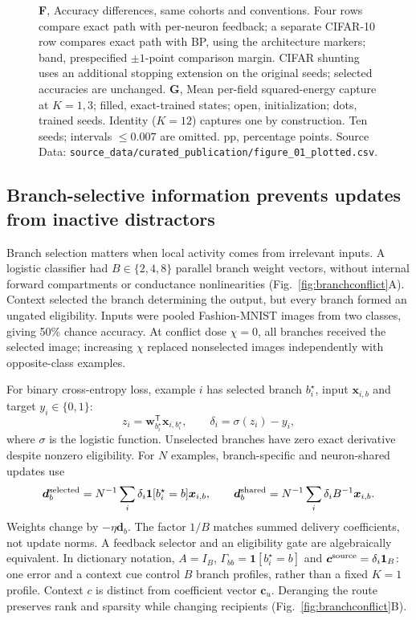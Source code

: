 \documentclass[11pt]{article}
\begin{document}
\begin{figure}[tbp]
{\textbf{F}, Accuracy differences, same cohorts and conventions. Four rows compare exact path with per-neuron feedback; a separate CIFAR-10 row compares exact path with BP, using the architecture markers; band, prespecified $\pm1$-point comparison margin. CIFAR shunting uses an additional stopping extension on the original seeds; selected accuracies are unchanged.
\textbf{G}, Mean per-field squared-energy capture at $K=1,3$; filled, exact-trained states; open, initialization; dots, trained seeds. Identity ($K=12$) captures one by construction. Ten seeds; intervals $\leq0.007$ are omitted. pp, percentage points. Source Data: \texttt{source\_data/curated\_publication/figure\_01\_plotted.csv}.}
\label{fig:framework}
\end{figure}

\subsection*{Branch-selective information prevents updates from inactive distractors}

Branch selection matters when local activity comes from irrelevant inputs. A logistic classifier had $B\in\{2,4,8\}$ parallel branch weight vectors, without internal forward compartments or conductance nonlinearities (Fig.~\ref{fig:branchconflict}A). Context selected the branch determining the output, but every branch formed an ungated eligibility. Inputs were pooled Fashion-MNIST images from two classes, giving 50\% chance accuracy. At conflict dose $\chi=0$, all branches received the selected image; increasing $\chi$ replaced nonselected images independently with opposite-class examples.

For binary cross-entropy loss, example $i$ has selected branch $b_i^\star$, input $\bm x_{i,b}$ and target $y_i\in\{0,1\}$:
\begin{equation}
z_i=\bm w_{b_i^\star}^{\mathsf T}\bm x_{i,b_i^\star},\qquad
\delta_i=\sigma(z_i)-y_i,
\label{eq:branchconflictforward}
\end{equation}
where $\sigma$ is the logistic function. Unselected branches have zero exact derivative despite nonzero eligibility. For $N$ examples, branch-specific and neuron-shared updates use
\begin{equation}
\bm d_b^{\rm selected}=N^{-1}\sum_i\delta_i\mathbf1[b_i^\star=b]\bm x_{i,b},\qquad
\bm d_b^{\rm shared}=N^{-1}\sum_i\delta_i B^{-1}\bm x_{i,b}.
\label{eq:branchconflictupdates}
\end{equation}
Weights change by $-\eta\bm d_b$. The factor $1/B$ matches summed delivery coefficients, not update norms. A feedback selector and an eligibility gate are algebraically equivalent. In dictionary notation, $A=I_B$, $\Gamma_{bb}=\mathbf1[b_i^\star=b]$ and $\bm c^{\rm source}=\delta_i\bm1_B$: one error and a context cue control $B$ branch profiles, rather than a fixed $K=1$ profile. Context $c$ is distinct from coefficient vector $\bm c_u$. Deranging the route preserves rank and sparsity while changing recipients (Fig.~\ref{fig:branchconflict}B).
\end{document}
